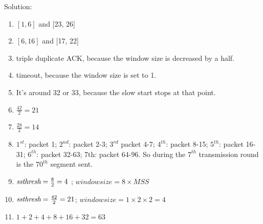\documentclass{article}
\begin{document}
\noindent Solution:\\
\begin{enumerate}
\item $\left[1, 6\right]$ and [23, 26]
\item $\left[6, 16\right]$ and [17, 22]
\item triple duplicate ACK, because the window size is decreased by a half.
\item timeout, because the window size is set to 1.
\item It's around 32 or 33, because the slow start stops at that point.
\item $\frac{42}{2} = 21$
\item $\frac{28}{2} = 14$
\item \emph{$1^{st}$}: packet 1; \emph{$2^{nd}$}: packet 2-3; \emph{$3^{rd}$} packet 4-7; \emph{$4^{th}$}: packet 8-15; \emph{$5^{th}$}: packet 16-31; \emph{$6^{th}$}: packet 32-63; 7th: packet 64-96. So during the \emph{$7^{th}$} transmission round is the \emph{$70^{th}$} segment sent.
\item $\emph{ssthresh} = \frac{8}{2} = 4$ ; $window size = 8 \times MSS$
\item $\emph{ssthresh} = \frac{42}{2} = 21$; $window size = 1 \times 2 \times 2 = 4$
\item $1 + 2 + 4 + 8 + 16 + 32 = 63$

\end{enumerate}
\end{document}
